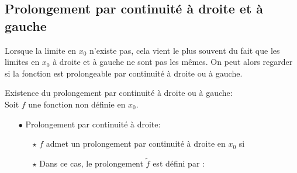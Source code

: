 \documentclass[a4paper, 11pt]{article}
\begin{document}
{%

%
%
% 

\subsection{Prolongement par continuit\'e \`a droite et \`a gauche}

\noindent Lorsque la limite en $x_0$ n'existe pas, cela vient le plus souvent du fait que les limites en $x_0$ \`{a} droite et \`{a} gauche ne sont pas les m\^{e}mes. On peut alors regarder si la fonction est prolongeable par continuit\'e \`{a} droite ou \`{a} gauche.\vsec\vsec

{\noindent

	\begin{prop} Existence du prolongement par continuit\'e \`{a} droite ou \`{a} gauche:\\
		Soit $f$ une fonction non d\'efinie en $x_0$.
		\begin{itemize}
			\item[$\bullet$] Prolongement par continuit\'e \`{a} droite:
			      \begin{itemize}
				      \item[$\star$] $f$ admet un prolongement par continuit\'e \`a droite en $x_0$ si \dotfill
				      \item[$\star$]
				            Dans ce cas, le prolongement $\tilde f$ est d\'efini par :
				            \vspace{1.5cm}


\end{itemize}
\end{itemize}
\end{prop}}}
\end{document}
